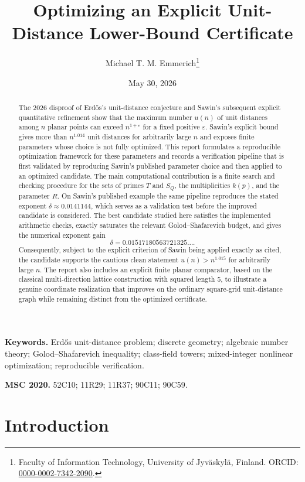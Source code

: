 \documentclass[a4paper,12pt]{article}
\title{\textbf{Optimizing an Explicit Unit-Distance Lower-Bound Certificate}}
\author{Michael T. M. Emmerich\thanks{Faculty of Information Technology, University of Jyv\"askyl\"a, Finland. ORCID: \href{https://orcid.org/0000-0002-7342-2090}{0000-0002-7342-2090}.}}
\date{May 30, 2026}
\begin{document}
\maketitle

\begin{abstract}
The 2026 disproof of Erd\H{o}s's unit-distance conjecture and Sawin's subsequent explicit quantitative refinement show that the maximum number $u(n)$ of unit distances among $n$ planar points can exceed $n^{1+\varepsilon}$ for a fixed positive $\varepsilon$.  Sawin's explicit bound gives more than $n^{1.014}$ unit distances for arbitrarily large $n$ and exposes finite parameters whose choice is not fully optimized.  This report formulates a reproducible optimization framework for these parameters and records a verification pipeline that is first validated by reproducing Sawin's published parameter choice and then applied to an optimized candidate.  The main computational contribution is a finite search and checking procedure for the sets of primes $T$ and $S_Q$, the multiplicities $k(p)$, and the parameter $R$.  On Sawin's published example the same pipeline reproduces the stated exponent $\delta\approx 0.0141144$, which serves as a validation test before the improved candidate is considered.  The best candidate studied here satisfies the implemented arithmetic checks, exactly saturates the relevant Golod--Shafarevich budget, and gives the numerical exponent gain
\[
\delta=0.01517180563721325\ldots .
\]
Consequently, subject to the explicit criterion of Sawin being applied exactly as cited, the candidate supports the cautious clean statement $u(n)>n^{1.015}$ for arbitrarily large $n$.  The report also includes an explicit finite planar comparator, based on the classical multi-direction lattice construction with squared length 5, to illustrate a genuine coordinate realization that improves on the ordinary square-grid unit-distance graph while remaining distinct from the optimized certificate.
\end{abstract}

\noindent\textbf{Keywords.} Erd\H{o}s unit-distance problem; discrete geometry; algebraic number theory; Golod--Shafarevich inequality; class-field towers; mixed-integer nonlinear optimization; reproducible verification.

\medskip

\noindent\textbf{MSC 2020.} 52C10; 11R29; 11R37; 90C11; 90C59.

\section{Introduction}
\end{document}
